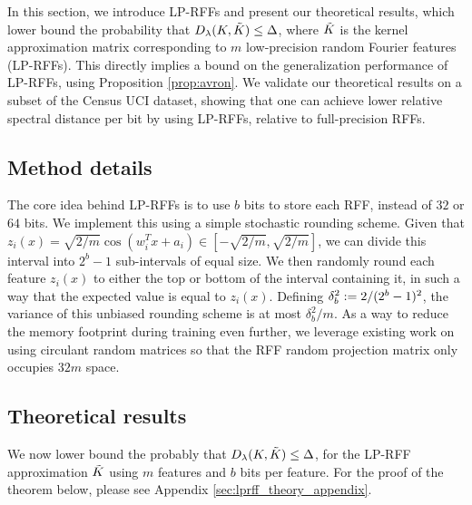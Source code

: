 In this section, we introduce LP-RFFs and present our theoretical results, which lower bound the probability that $D_{\lambda}(K,\tilde{K}) \leq \Delta$, where $\tilde{K}$ is the kernel approximation matrix corresponding to $m$ low-precision random Fourier features (LP-RFFs). This directly implies a bound on the generalization performance of LP-RFFs, using Proposition \ref{prop:avron}. We validate our theoretical results on a subset of the Census UCI dataset, showing that one can achieve lower relative spectral distance per bit by using LP-RFFs, relative to full-precision RFFs.

\subsection{Method details}
\label{subsec:method_details}
The core idea behind LP-RFFs is to use $b$ bits to store each RFF, instead of $32$ or $64$ bits. We implement this using a simple stochastic rounding scheme. Given that $z_i(x) = \sqrt{2/m}\cos(w_i^T x + a_i) \in [-\sqrt{2/m},\sqrt{2/m}]$, we can divide this interval into $2^b - 1$ sub-intervals of equal size. We then randomly round each feature $z_i(x)$ to either the top or bottom of the interval containing it, in such a way that the expected value is equal to $z_i(x)$. Defining $\delta_b^2 := 2/(2^b-1)^2$, the variance of this unbiased rounding scheme is at most $\delta_b^2/m$.  As a way to reduce the memory footprint during training even further, we leverage existing work on using circulant random matrices \citep{yu15} so that the RFF random projection matrix only occupies $32m$ space.

\subsection{Theoretical results}

We now lower bound the probably that $D_{\lambda}(K,\tilde{K}) \leq \Delta$, for the LP-RFF approximation $\tilde{K}$ using $m$ features and $b$ bits per feature.  For the proof of the theorem below, please see Appendix \ref{sec:lprff_theory_appendix}.

